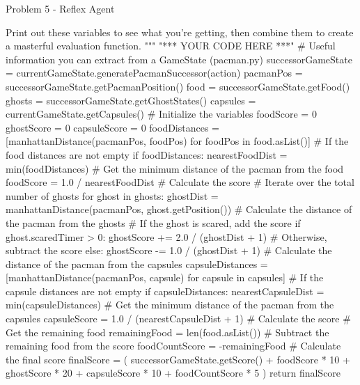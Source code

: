 \begin{problem}{Problem 5 - Reflex Agent}
\begin{highlight}[Solution]
\begin{code}[Python]
        Print out these variables to see what you're getting, then combine them
        to create a masterful evaluation function.
        """
        "*** YOUR CODE HERE ***"
        # Useful information you can extract from a GameState (pacman.py)
        successorGameState = currentGameState.generatePacmanSuccessor(action)
        pacmanPos = successorGameState.getPacmanPosition()
        food = successorGameState.getFood()
        ghosts = successorGameState.getGhostStates()
        capsules = currentGameState.getCapsules()
        # Initialize the variables
        foodScore = 0
        ghostScore = 0
        capsuleScore = 0
        foodDistances = [manhattanDistance(pacmanPos, foodPos) for foodPos in food.asList()]
        # If the food distances are not empty
        if foodDistances:
            nearestFoodDist = min(foodDistances)  # Get the minimum distance of the pacman from the food
            foodScore = 1.0 / nearestFoodDist # Calculate the score
        # Iterate over the total number of ghosts
        for ghost in ghosts:
            ghostDist = manhattanDistance(pacmanPos, ghost.getPosition()) # Calculate the distance of the pacman from the ghosts
            # If the ghost is scared, add the score
            if ghost.scaredTimer > 0:
                ghostScore += 2.0 / (ghostDist + 1)
            # Otherwise, subtract the score
            else:
                ghostScore -= 1.0 / (ghostDist + 1)
        # Calculate the distance of the pacman from the capsules
        capsuleDistances = [manhattanDistance(pacmanPos, capsule) for capsule in capsules]
        # If the capsule distances are not empty
        if capsuleDistances:
            nearestCapsuleDist = min(capsuleDistances)  # Get the minimum distance of the pacman from the capsules
            capsuleScore = 1.0 / (nearestCapsuleDist + 1) # Calculate the score
        # Get the remaining food
        remainingFood = len(food.asList())
        # Subtract the remaining food from the score
        foodCountScore = -remainingFood
        # Calculate the final score
        finalScore = (
            successorGameState.getScore() +
            foodScore * 10 +                 
            ghostScore * 20 +                
            capsuleScore * 10 +              
            foodCountScore * 5               
        )
        return finalScore
    \end{code}
    \end{highlight}
\end{problem}

